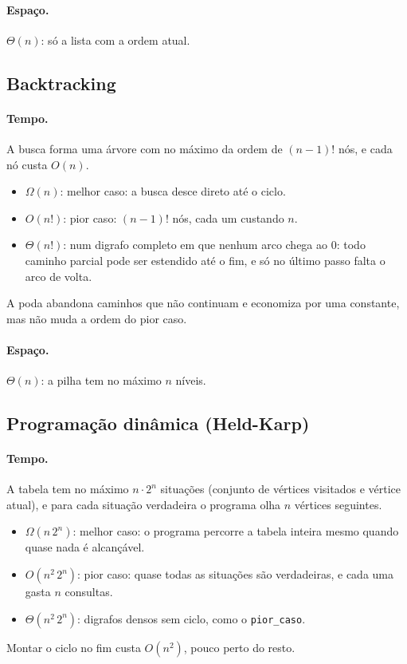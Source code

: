 \documentclass[12pt,a4paper]{article}
\begin{document}
\paragraph{Espaço.} $\Theta(n)$: só a lista com a ordem atual.

\subsection{Backtracking}

\paragraph{Tempo.} A busca forma uma árvore com no máximo da ordem de $(n-1)!$ nós, e cada nó custa $O(n)$.
\begin{itemize}
  \item $\Omega(n)$: melhor caso: a busca desce direto até o ciclo.
  \item $O(n!)$: pior caso: $(n-1)!$ nós, cada um custando $n$.
  \item $\Theta(n!)$: num digrafo completo em que nenhum arco chega ao $0$: todo caminho parcial pode ser estendido até o fim, e só no último passo falta o arco de volta.
\end{itemize}
A poda abandona caminhos que não continuam e economiza por uma constante, mas não muda a ordem do pior caso.

\paragraph{Espaço.} $\Theta(n)$: a pilha tem no máximo $n$ níveis.

\subsection{Programação dinâmica (Held-Karp)}

\paragraph{Tempo.} A tabela tem no máximo $n\cdot 2^n$ situações (conjunto de vértices visitados e vértice atual), e para cada situação verdadeira o programa olha $n$ vértices seguintes.
\begin{itemize}
  \item $\Omega(n\,2^n)$: melhor caso: o programa percorre a tabela inteira mesmo quando quase nada é alcançável.
  \item $O(n^2\,2^n)$: pior caso: quase todas as situações são verdadeiras, e cada uma gasta $n$ consultas.
  \item $\Theta(n^2\,2^n)$: digrafos densos sem ciclo, como o \texttt{pior\_caso}.
\end{itemize}
Montar o ciclo no fim custa $O(n^2)$, pouco perto do resto.
\end{document}
